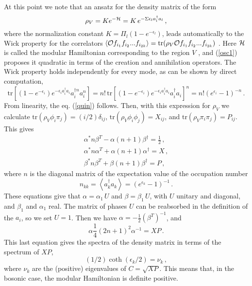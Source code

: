 \documentclass[a4paper]{article}
\begin{document}
At this point we note that an ansatz for the density matrix of the form \cite{peschel,chung}
\begin{equation}
\rho _{V}=K e^{-{\cal H}}=K\,e^{-\Sigma \epsilon _{l}a_{l}^{\dagger }a_{l}}\,,  \label{osc1}
\end{equation}
where  the normalization constant $K=\Pi_l (1-e^{-\epsilon_l} )$, leads automatically to the Wick property for the correlators  
$\left<{\cal O} f_{i_1} f_{i_2}...f_{i_{2k}}\right>=\textrm{tr}(\rho _{V}  {\cal O} f_{i_1} f_{i_2}...f_{i_{2k}})$ \cite{wick}. Here ${\cal H}$ is called the modular Hamiltonian corresponding to the region $V$ \cite{haag}, and (\ref{osc1}) proposes it quadratic in terms of the creation and annihilation operators. 
 The Wick property holds independently for every mode, as can be shown by direct computation,
\begin{equation}
\textrm{tr} \left[(1-e^{-\epsilon_i} ) e^{-\epsilon_i a^\dagger_i a_i}      a_i^{\dagger n}   a_i^n   \right]=n!\,\textrm{tr}\left[(1-e^{-\epsilon_i} ) e^{-\epsilon_i a^\dagger_i a_i}  a_i^{\dagger} a_i   \right]^n= n! (e^{\epsilon_i} -1)^{-n}\,.
\end{equation}
From linearity, the eq. (\ref{quin}) follows.    
Then, with this expression for $\rho_V$ we calculate $\textrm{tr} (\rho_V \phi_i\pi_j)=(i/2)\delta_{ij}$, $\textrm{tr} (\rho_V \phi_i\phi_j)=X_{ij}$, and $\textrm{tr} (\rho_V \pi_i\pi_j)= P_{ij}$. This gives  
\begin{eqnarray}
\alpha^* n \beta^T -\alpha (n+1)\beta^\dagger=\frac{1}{2}\,,\\
\alpha^* n \alpha^T+ \alpha (n+1) \alpha^\dagger=X \,,\\
\beta^* n \beta^T+ \beta (n+1) \beta^\dagger=P\,,
\end{eqnarray}
where $n$ is the diagonal matrix of the expectation value of the occupation number 
\begin{equation}
n_{kk}=\left<a^\dagger_k a_k\right>=(e^{\epsilon_k}-1)^{-1}\,.
\end{equation} 
These equations give that  
$\alpha =\alpha_1 \, U $ and $
\beta = \beta_1 \, U $,
with $U$ unitary and diagonal, and $\beta_1$ and $\alpha_1$ real. The matrix of phases $U$ can be reabsorbed in the definition of the $a_i$, so we set $U=1$. Then we have 
 $
\alpha=-\frac{1}{2} (\beta^T)^{-1}$, and 
\begin{equation}
\alpha \frac{1}{4}(2n+1)^2 \alpha^{-1}=X P\,.
\end{equation}
This last equation gives the spectra of the density matrix in terms of the spectrum of $X P$,  
\begin{equation}
(1/2)\coth(\epsilon_k/2)=\nu_k \,,
\end{equation}
 where $\nu_k$ are the (positive) eigenvalues of $C=\sqrt{XP}$. This means that, in the bosonic case, the modular Hamiltonian is definite positive.
 
\end{document}

